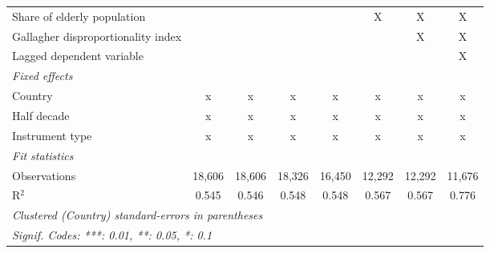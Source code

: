 \begin{tabular}{lccccccc}
   Share of elderly population                                       &               &               &               &                & X              & X              & X\\  
   Gallagher disproportionality index                                &               &               &               &                &                & X              & X\\  
   Lagged dependent variable                                         &               &               &               &                &                &                & X\\  
   \emph{Fixed effects}\\
   Country                                                           & x             & x             & x             & x              & x              & x              & x\\  
   Half decade                                                       & x             & x             & x             & x              & x              & x              & x\\  
   Instrument type                                                   & x             & x             & x             & x              & x              & x              & x\\  
   \midrule \emph{Fit statistics}\\
   Observations                                                      & 18,606        & 18,606        & 18,326        & 16,450         & 12,292         & 12,292         & 11,676\\  
   R$^2$                                                             & 0.545         & 0.546         & 0.548         & 0.548          & 0.567          & 0.567          & 0.776\\  
   \midrule
   \multicolumn{8}{l}{\emph{Clustered (Country) standard-errors in parentheses}}\\
   \multicolumn{8}{l}{\emph{Signif. Codes: ***: 0.01, **: 0.05, *: 0.1}}\\
\end{tabular}
\par\endgroup


